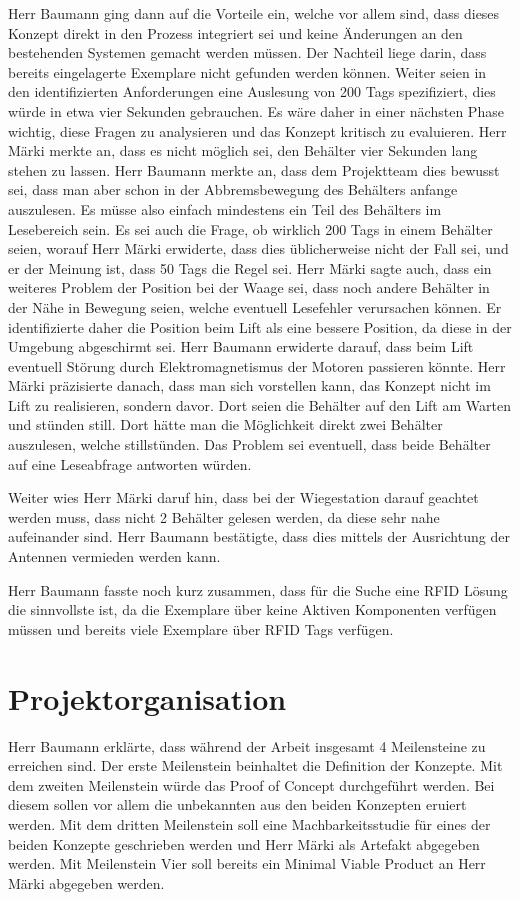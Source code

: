 \documentclass[parskip=full, a4paper]{scrreprt}
\begin{document}
Herr Baumann ging dann auf die Vorteile ein, welche vor allem sind, dass dieses Konzept direkt in den Prozess integriert sei und keine Änderungen an den bestehenden Systemen gemacht werden müssen. Der Nachteil liege darin, dass bereits eingelagerte Exemplare nicht gefunden werden können. Weiter seien in den identifizierten Anforderungen eine Auslesung von 200 Tags spezifiziert, dies würde in etwa vier Sekunden gebrauchen. Es wäre daher in einer nächsten Phase wichtig, diese Fragen zu analysieren und das Konzept kritisch zu evaluieren. Herr Märki merkte an, dass es nicht möglich sei, den Behälter vier Sekunden lang stehen zu lassen. Herr Baumann merkte an, dass dem Projektteam dies bewusst sei, dass man aber schon in der Abbremsbewegung des Behälters anfange auszulesen. Es müsse also einfach mindestens ein Teil des Behälters im Lesebereich sein. Es sei auch die Frage, ob wirklich 200 Tags in einem Behälter seien, worauf Herr Märki erwiderte, dass dies üblicherweise nicht der Fall sei, und er der Meinung ist, dass 50 Tags die Regel sei. Herr Märki sagte auch, dass ein weiteres Problem der Position bei der Waage sei, dass noch andere Behälter in der Nähe in Bewegung seien, welche eventuell Lesefehler verursachen können. Er identifizierte daher die Position beim Lift als eine bessere Position, da diese in der Umgebung abgeschirmt sei. Herr Baumann erwiderte darauf, dass beim Lift eventuell Störung durch Elektromagnetismus der Motoren passieren könnte. Herr Märki präzisierte danach, dass man sich vorstellen kann, das Konzept nicht im Lift zu realisieren, sondern davor. Dort seien die Behälter auf den Lift am Warten und stünden still. Dort hätte man die Möglichkeit direkt zwei Behälter auszulesen, welche stillstünden. Das Problem sei eventuell, dass beide Behälter auf eine Leseabfrage antworten würden.

Weiter wies Herr Märki daruf hin, dass bei der Wiegestation darauf geachtet werden muss, dass nicht 2 Behälter gelesen werden, da diese sehr nahe aufeinander sind. Herr Baumann bestätigte, dass dies mittels der Ausrichtung der Antennen vermieden werden kann.

Herr Baumann fasste noch kurz zusammen, dass für die Suche eine RFID Lösung die sinnvollste ist, da die Exemplare über keine Aktiven Komponenten verfügen müssen und bereits viele Exemplare über RFID Tags verfügen.

\chapter{Projektorganisation}
Herr Baumann erklärte, dass während der Arbeit insgesamt 4 Meilensteine zu erreichen sind. Der erste Meilenstein beinhaltet die Definition der Konzepte. Mit dem zweiten Meilenstein würde das Proof of Concept durchgeführt werden. Bei diesem sollen vor allem die unbekannten aus den beiden Konzepten eruiert werden. Mit dem dritten Meilenstein soll eine Machbarkeitsstudie für eines der beiden Konzepte geschrieben werden und Herr Märki als Artefakt abgegeben werden. Mit Meilenstein Vier soll bereits ein Minimal Viable Product an Herr Märki abgegeben werden.
\end{document}
